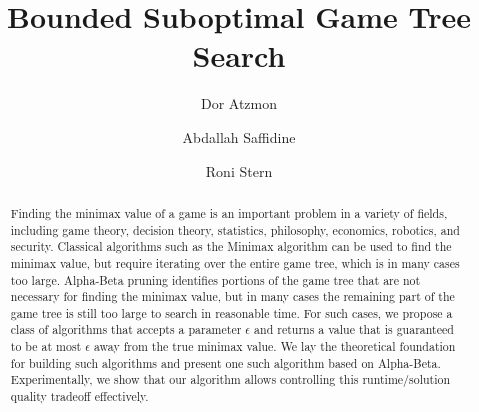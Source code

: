 \documentclass[runningheads]{llncs}
\begin{document}
%
\title{Bounded Suboptimal Game Tree Search}
%
%
\author{Dor Atzmon \and
Abdallah Saffidine \and
Roni Stern}
%
%
%
\maketitle              %

\begin{abstract}
Finding the minimax value of a game is an important problem in a variety of fields, including game theory, decision theory,  statistics, philosophy, economics, robotics, and security. Classical algorithms such as the Minimax algorithm can be used to find the minimax value, but require iterating over the entire game tree, which is in many cases too large. Alpha-Beta pruning identifies portions of the game tree that are not necessary for finding the minimax value, but in many cases the remaining part of the game tree is still too large to search in reasonable time. %
For such cases, we propose a class of algorithms that accepts a parameter $\epsilon$ and returns a value that is guaranteed to be at most $\epsilon$ away from the true minimax value. We lay the theoretical foundation for building such algorithms and present one such algorithm based on Alpha-Beta. Experimentally, we show that our  algorithm allows controlling this runtime/solution quality tradeoff effectively. %




\end{abstract}
\end{document}
